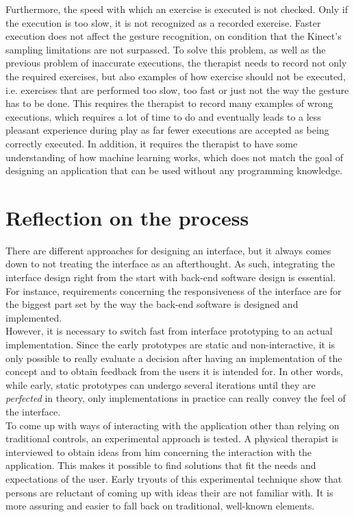 Furthermore, the speed with which an exercise is executed is not checked. Only if the execution is too slow, it is not recognized as a recorded exercise. Faster execution does not affect the gesture recognition, on condition that the Kinect's sampling limitations are not surpassed. To solve this problem, as well as the previous problem of inaccurate executions, the therapist needs to record not only the required exercises, but also examples of how exercise should not be executed, i.e. exercises that are performed too slow, too fast or just not the way the gesture has to be done. This requires the therapist to record many examples of wrong executions, which requires a lot of time to do and eventually leads to a less pleasant experience during play as far fewer executions are accepted as being correctly executed. In addition, it requires the therapist to have some understanding of how machine learning works, which does not match the goal of designing an application that can be used without any programming knowledge.

\section{Reflection on the process}

There are different approaches for designing an interface, but it always comes down to not treating the interface as an afterthought. As such, integrating the interface design right from the start with back-end software design is essential. For instance, requirements concerning the responsiveness of the interface are for the biggest part set by the way the back-end software is designed and implemented.\\

However, it is necessary to switch fast from interface prototyping to an actual implementation. Since the early prototypes are static and non-interactive, it is only possible to really evaluate a decision after having an implementation of the concept and to obtain feedback from the users it is intended for. In other words, while early, static prototypes can undergo several iterations until they are \emph{perfected} in theory, only implementations in practice can really convey the feel of the interface.\\

To come up with ways of interacting with the application other than relying on traditional controls, an experimental approach is tested. A physical therapist is interviewed to obtain ideas from him concerning the interaction with the application. This makes it possible to find solutions that fit the needs and expectations of the user. Early tryouts of this experimental technique show that persons are reluctant of coming up with ideas their are not familiar with. It is more assuring and easier to fall back on traditional, well-known elements.\\

